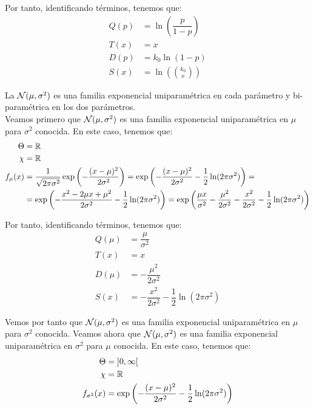 \begin{ejemplo}
\begin{enumerate}
        Por tanto, identificando términos, tenemos que:
        \begin{align*}
            Q(p) &= \ln\left(\dfrac{p}{1-p}\right) \\
            T(x) &= x \\
            D(p) &= k_0\ln(1-p) \\
            S(x) &= \ln\left(\binom{k_0}{x}\right)
        \end{align*}
    \end{enumerate}
    
\end{ejemplo}


\begin{ejercicio}
    La $\mathcal{N}(\mu, \sigma^2)$ es una familia exponencial uniparamétrica en cada parámetro y bi-paramétrica en los dos parámetros.\\

    Veamos primero que $\mathcal{N}(\mu, \sigma^2)$ es una familia exponencial uniparamétrica en $\mu$ para $\sigma^2$ conocida. En este caso, tenemos que:
    \begin{align*}
        \Theta &= \mathbb{R} \\
        \chi &= \mathbb{R} \\
        f_\mu(x) &= \dfrac{1}{\sqrt{2\pi\sigma^2}} \exp\left(-\dfrac{(x-\mu)^2}{2\sigma^2}\right) = \exp\left(-\dfrac{(x-\mu)^2}{2\sigma^2} - \dfrac{1}{2}\ln(2\pi\sigma^2)\right)
        =\\&= \exp\left(-\dfrac{x^2 - 2\mu x + \mu^2}{2\sigma^2} - \dfrac{1}{2}\ln(2\pi\sigma^2)\right)
        = \exp\left(\dfrac{\mu x}{\sigma^2} - \dfrac{\mu^2}{2\sigma^2} - \dfrac{x^2}{2\sigma^2} - \dfrac{1}{2}\ln(2\pi\sigma^2)\right)
    \end{align*}

    Por tanto, identificando términos, tenemos que:
    \begin{align*}
        Q(\mu) &= \dfrac{\mu}{\sigma^2} \\
        T(x) &= x \\
        D(\mu) &= -\dfrac{\mu^2}{2\sigma^2} \\
        S(x) &= -\dfrac{x^2}{2\sigma^2} - \dfrac{1}{2}\ln(2\pi\sigma^2)
    \end{align*}

    Vemos por tanto que $\mathcal{N}(\mu, \sigma^2)$ es una familia exponencial uniparamétrica en $\mu$ para $\sigma^2$ conocida. Veamos ahora que $\mathcal{N}(\mu, \sigma^2)$ es una familia exponencial uniparamétrica en $\sigma^2$ para $\mu$ conocida. En este caso, tenemos que:
    \begin{align*}
        \Theta &= \left]0, \infty\right[ \\
        \chi &= \mathbb{R} \\
        f_{\sigma^2}(x) &= \exp\left(-\dfrac{(x-\mu)^2}{2\sigma^2} - \dfrac{1}{2}\ln(2\pi\sigma^2)\right)
    \end{align*}


\end{ejercicio}
